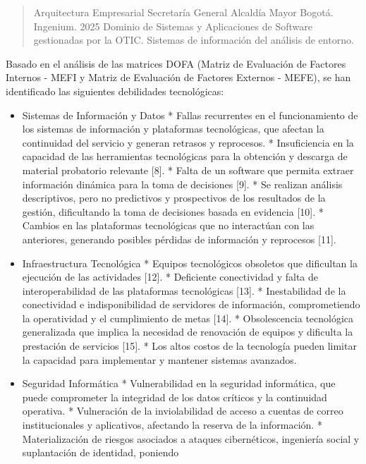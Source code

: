 \documentclass[
	a4paper, %
	12pt, %
]{include/CSSullivanBusinessReport}
\begin{document}
\begin{quote}
Arquitectura Empresarial Secretaría General Alcaldía Mayor Bogotá.
Ingenium. 2025 Dominio de Sistemas y Aplicaciones de Software
gestionadas por la OTIC. Sistemas de información del análisis de
entorno.
\end{quote}

Basado en el análisis de las matrices DOFA (Matriz de Evaluación de
Factores Internos - MEFI y Matriz de Evaluación de Factores Externos -
MEFE), se han identificado las siguientes debilidades tecnológicas:

\begin{itemize}
\item
  Sistemas de Información y Datos * Fallas recurrentes en el
  funcionamiento de los sistemas de información y plataformas
  tecnológicas, que afectan la continuidad del servicio y generan
  retrasos y reprocesos. * Insuficiencia en la capacidad de las
  herramientas tecnológicas para la obtención y descarga de material
  probatorio relevante {[}8{]}. * Falta de un software que permita
  extraer información dinámica para la toma de decisiones {[}9{]}. * Se
  realizan análisis descriptivos, pero no predictivos y prospectivos de
  los resultados de la gestión, dificultando la toma de decisiones
  basada en evidencia {[}10{]}. * Cambios en las plataformas
  tecnológicas que no interactúan con las anteriores, generando posibles
  pérdidas de información y reprocesos {[}11{]}.
\item
  Infraestructura Tecnológica * Equipos tecnológicos obsoletos que
  dificultan la ejecución de las actividades {[}12{]}. * Deficiente
  conectividad y falta de interoperabilidad de las plataformas
  tecnológicas {[}13{]}. * Inestabilidad de la conectividad e
  indisponibilidad de servidores de información, comprometiendo la
  operatividad y el cumplimiento de metas {[}14{]}. * Obsolescencia
  tecnológica generalizada que implica la necesidad de renovación de
  equipos y dificulta la prestación de servicios {[}15{]}. * Los altos
  costos de la tecnología pueden limitar la capacidad para implementar y
  mantener sistemas avanzados.
\item
  Seguridad Informática * Vulnerabilidad en la seguridad informática,
  que puede comprometer la integridad de los datos críticos y la
  continuidad operativa. * Vulneración de la inviolabilidad de acceso a
  cuentas de correo institucionales y aplicativos, afectando la reserva
  de la información. * Materialización de riesgos asociados a ataques
  cibernéticos, ingeniería social y suplantación de identidad, poniendo

\end{itemize}
\end{document}
